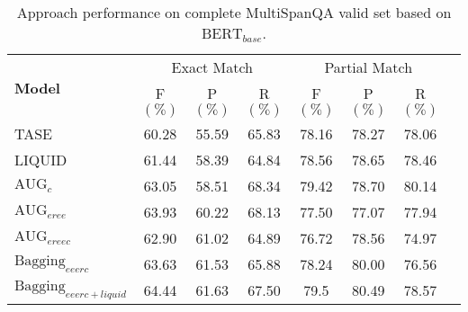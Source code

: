 \begin{table*}[width=\textwidth,cols=9,pos=h]  %
	\caption{Approach performance on complete MultiSpanQA valid set based on $\text{BERT}_{base}$.} 
	\label{tab:bertall}
	\begin{tabular*}{\textwidth}{@{\extracolsep{\fill}}lccccccc}
		\toprule
		\multirow{2}{*}{\textbf{Model}} & \multicolumn{3}{c}{Exact Match} & \multicolumn{3}{c}{Partial Match}  \\
		\cline{2-7} 
		\addlinespace
		& F\((\%)\) & P\((\%)\) & R\((\%)\) & F\((\%)\) & P\((\%)\) & R\((\%)\) \\
		\midrule
		TASE   & 60.28 & 55.59 & 65.83 & 78.16 & 78.27 & 78.06 \\ 
		LIQUID & 61.44 & 58.39 & 64.84 & 78.56 & 78.65 & 78.46 \\
		$\text{AUG}_{c}$ & 63.05 & 58.51 & 68.34 & 79.42 & 78.70 & 80.14 \\
		$\text{AUG}_{eree}$  & 63.93 & 60.22 & 68.13 & 77.50 & 77.07 & 77.94 \\
		$\text{AUG}_{ereec}$ & 62.90  & 61.02 & 64.89 & 76.72 & 78.56 & 74.97 \\
		$\text{Bagging}_{eeerc}$ & 63.63  & 61.53 & 65.88 & 78.24 & 80.00 & 76.56 \\
		$\text{Bagging}_{eeerc+liquid}$ & 64.44 & 61.63 & 67.50 & 79.5 & 80.49 & 78.57 \\
		\bottomrule
	\end{tabular*}
\end{table*}

